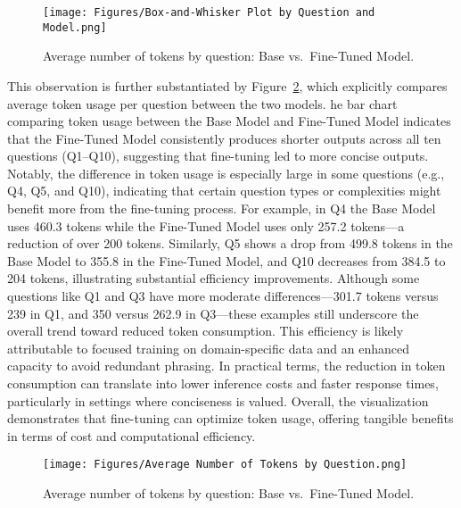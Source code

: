\documentclass[12pt,oneside,openany]{report}
\begin{document}
\begin{figure}[H]
    \centering
    \texttt{[image: Figures/Box-and-Whisker Plot by Question and Model.png]}
    \caption{Average number of tokens by question: Base vs.\ Fine-Tuned Model.}
    \label{fig:avg-token-by-question}
\end{figure}


This observation is further substantiated by Figure~\ref{fig:avg-tokens-by-question}, which explicitly compares average token usage per question between the two models. he bar chart comparing token usage between the Base Model and Fine-Tuned Model indicates that the Fine-Tuned Model consistently produces shorter outputs across all ten questions (Q1–Q10), suggesting that fine-tuning led to more concise outputs. Notably, the difference in token usage is especially large in some questions (e.g., Q4, Q5, and Q10), indicating that certain question types or complexities might benefit more from the fine-tuning process. For example, in Q4 the Base Model uses 460.3 tokens while the Fine-Tuned Model uses only 257.2 tokens—a reduction of over 200 tokens. Similarly, Q5 shows a drop from 499.8 tokens in the Base Model to 355.8 in the Fine-Tuned Model, and Q10 decreases from 384.5 to 204 tokens, illustrating substantial efficiency improvements. Although some questions like Q1 and Q3 have more moderate differences—301.7 tokens versus 239 in Q1, and 350 versus 262.9 in Q3—these examples still underscore the overall trend toward reduced token consumption. This efficiency is likely attributable to focused training on domain-specific data and an enhanced capacity to avoid redundant phrasing. In practical terms, the reduction in token consumption can translate into lower inference costs and faster response times, particularly in settings where conciseness is valued. Overall, the visualization demonstrates that fine-tuning can optimize token usage, offering tangible benefits in terms of cost and computational efficiency.

\begin{figure}[H]
    \centering
    \texttt{[image: Figures/Average Number of Tokens by Question.png]}
    \caption{Average number of tokens by question: Base vs.\ Fine-Tuned Model.}
    \label{fig:avg-tokens-by-question}
\end{figure}
\end{document}
